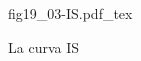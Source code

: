 \begin{figure}[h]
\centering
\def\svgwidth{0.5\textwidth}
{fig19_03-IS.pdf_tex}
\caption{La curva IS}
\label{fig19_03-IS}
\end{figure}